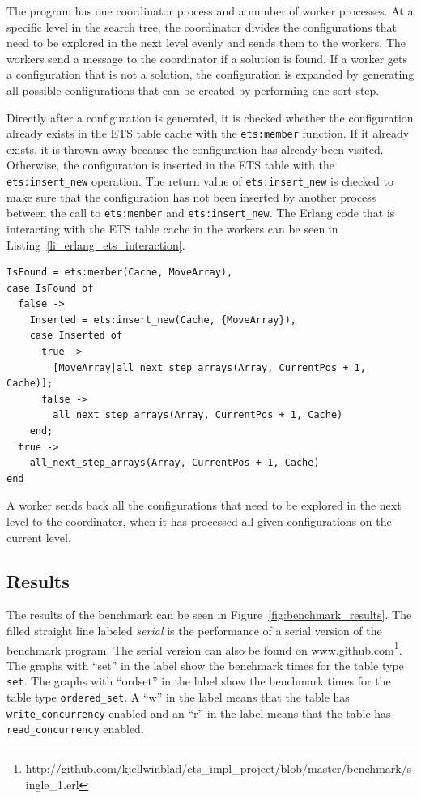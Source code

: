 \documentclass[aps,pre,preprint,nofootinbib]{revtex4}
\begin{document}
The program has one coordinator process and a number of worker processes.
At a specific level in the search tree, the coordinator divides the configurations that need to be explored in the next level evenly and sends them to the workers.
The workers send a message to the coordinator if a solution is found.
If a worker gets a configuration that is not a solution, the configuration is expanded by generating all possible configurations that can be created by performing one sort step.

Directly after a configuration is generated, it is checked whether the configuration already exists in the ETS table cache with the \verb|ets:member| function.
If it already exists, it is thrown away because the configuration has already been visited.
Otherwise, the configuration is inserted in the ETS table with the \verb|ets:insert_new| operation.
The return value of \verb|ets:insert_new| is checked to make sure that the configuration has not been inserted by another process between the call to \verb|ets:member| and \verb|ets:insert_new|.
The Erlang code that is interacting with the ETS table cache in the workers can be seen in Listing~\ref{li_erlang_ets_interaction}. 

\lstset{basicstyle=\ttfamily, keywordstyle=\bfseries, language=erlang, caption=Worker code that is interacting with ETS, label=li_erlang_ets_interaction}
\begin{lstlisting}[float=htb]
IsFound = ets:member(Cache, MoveArray),
case IsFound of
  false ->
    Inserted = ets:insert_new(Cache, {MoveArray}),
    case Inserted of
      true ->
        [MoveArray|all_next_step_arrays(Array, CurrentPos + 1, Cache)];
      false ->
        all_next_step_arrays(Array, CurrentPos + 1, Cache)
    end;
  true ->
    all_next_step_arrays(Array, CurrentPos + 1, Cache)
end
\end{lstlisting}

A worker sends back all the configurations that need to be explored in the next level to the coordinator, when it has processed all given configurations on the current level.

\subsection{Results} 

The results of the benchmark can be seen in Figure~\ref{fig:benchmark_results}.
The filled straight line labeled \emph{serial} is the performance of a serial version of the benchmark program.
The serial version can also be found on www.github.com\footnote{http://github.com/kjellwinblad/ets\_impl\_project/blob/master/benchmark/single\_1.erl}.
The graphs with ``set'' in the label show the benchmark times for the table type \verb|set|.
The graphs with ``ordset'' in the label show the benchmark times for the table type \verb|ordered_set|.
A ``w'' in the label means that the table has \verb|write_concurrency| enabled and an ``r'' in the label means that the table has \verb|read_concurrency| enabled.
\end{document}
